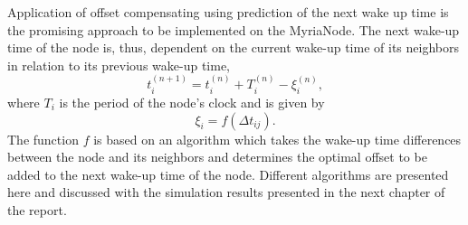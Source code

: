 \documentclass[a4paper,10pt]{report}
\begin{document}
Application of offset compensating using prediction of the next wake up time is the promising approach to be implemented on the MyriaNode. The next wake-up time of the node is, thus, dependent on the current wake-up time of its neighbors in relation to its previous wake-up time,
\begin{equation}
t_i^{(n+1)} = t_i^{(n)} + T_i^{(n)} - \xi_i^{(n)} ,
\end{equation}
where $T_i$ is the period of the node's clock and  is given by
\begin{equation}
\xi_i = f(\Delta t_{ij}).
\end{equation}
The function $f$ is based on an algorithm which takes the wake-up time differences between the node and its neighbors and determines
the optimal offset to be added to the next wake-up time of the node. 
\newline Different algorithms are presented here and discussed with the simulation results presented in the next chapter of the report.\newline
\end{document}
